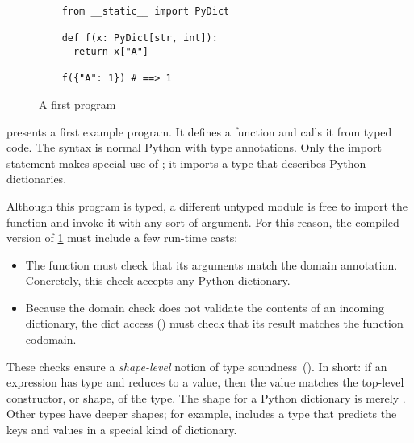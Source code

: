 \documentclass[a4paper,english,cleveref,autoref,thm-restate,anonymous,]{lipics-v2021}
\begin{document}
\begin{figure}
  \begin{verbatim}
    from __static__ import PyDict

    def f(x: PyDict[str, int]):
      return x["A"]

    f({"A": 1}) # ==> 1
  \end{verbatim}
%
%
%
%
  \caption{A first \SP{} program}
  \label{fig:sp-example}
\end{figure}

 presents a first example program.
It defines a function  and calls it from typed code.
The syntax is normal Python with type annotations.
Only the import statement makes special use of \SP{};
it imports a type  that describes Python dictionaries.

Although this program is typed, a different untyped module is free
to import the function  and invoke it with any sort of
argument.
For this reason, the compiled version of \cref{fig:sp-example} must
include a few run-time casts:
\begin{itemize}
  \item
    The function  must check that its arguments match the  domain annotation.
    Concretely, this check accepts any Python dictionary.
  \item
    Because the domain check does not validate the contents of an incoming dictionary,
    the dict access () must check that its result matches the function codomain.
\end{itemize}
These checks ensure a \emph{shape-level} notion of type soundness~(\cite{s:model}).
In short: if an expression has type  and reduces to a value, then the value
matches the top-level constructor, or shape, of the type.
The shape for a Python dictionary is merely .
Other types have deeper shapes; for example, \SP{} includes a 
type that predicts the keys and values in a special kind of dictionary.
\end{document}
